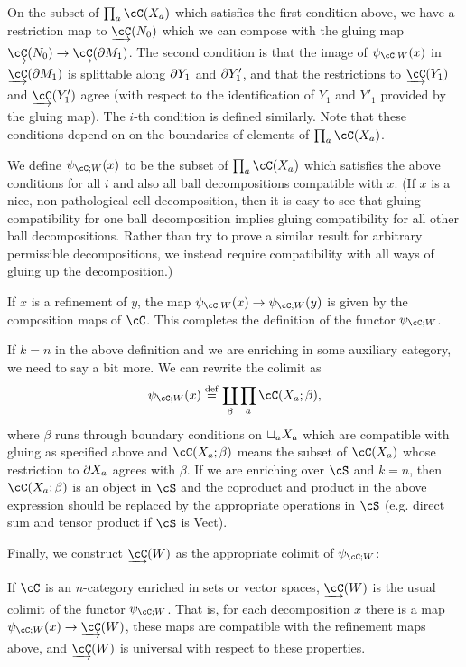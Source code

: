 On the subset of $\prod_a \cC(X_a)$ which satisfies the first condition above, we have a restriction
map to $\cl\cC(N_0)$ which we can compose with the gluing map 
$\cl\cC(N_0) \to \cl\cC(\bd M_1)$.
The second condition is that the image of $\psi_{\cC;W}(x)$ in $\cl\cC(\bd M_1)$ is splittable
along $\partial Y_1$ and $\partial Y'_1$, and that the restrictions to $\cl\cC(Y_1)$ and $\cl\cC(Y'_1)$ agree
(with respect to the identification of $Y_1$ and $Y'_1$ provided by the gluing map). 
The $i$-th condition is defined similarly.
Note that these conditions depend on on the boundaries of elements of $\prod_a \cC(X_a)$.

We define $\psi_{\cC;W}(x)$ to be the subset of $\prod_a \cC(X_a)$ which satisfies the 
above conditions for all $i$ and also all 
ball decompositions compatible with $x$.
(If $x$ is a nice, non-pathological cell decomposition, then it is easy to see that gluing
compatibility for one ball decomposition implies gluing compatibility for all other ball decompositions.
Rather than try to prove a similar result for arbitrary
permissible decompositions, we instead require compatibility with all ways of gluing up the decomposition.)

If $x$ is a refinement of $y$, the map $\psi_{\cC;W}(x) \to \psi_{\cC;W}(y)$ 
is given by the composition maps of $\cC$.
This completes the definition of the functor $\psi_{\cC;W}$.

If $k=n$ in the above definition and we are enriching in some auxiliary category, 
we need to say a bit more.
We can rewrite the colimit as
\[  %
	\psi_{\cC;W}(x) \deq \coprod_\beta \prod_a \cC(X_a; \beta) ,
\]  %
where $\beta$ runs through 
boundary conditions on $\sqcup_a X_a$ which are compatible with gluing as specified above
and $\cC(X_a; \beta)$
means the subset of $\cC(X_a)$ whose restriction to $\partial X_a$ agrees with $\beta$.
If we are enriching over $\cS$ and $k=n$, then $\cC(X_a; \beta)$ is an object in 
$\cS$ and the coproduct and product in the above expression should be replaced by the appropriate
operations in $\cS$ (e.g. direct sum and tensor product if $\cS$ is Vect).

Finally, we construct $\cl{\cC}(W)$ as the appropriate colimit of $\psi_{\cC;W}$:

\begin{defn}
\label{def:colim-fields}
If $\cC$ is an $n$-category enriched in sets or vector spaces, $\cl{\cC}(W)$ is the usual colimit of the functor $\psi_{\cC;W}$.
That is, for each decomposition $x$ there is a map
$\psi_{\cC;W}(x)\to \cl{\cC}(W)$, these maps are compatible with the refinement maps
above, and $\cl{\cC}(W)$ is universal with respect to these properties.
\end{defn}

